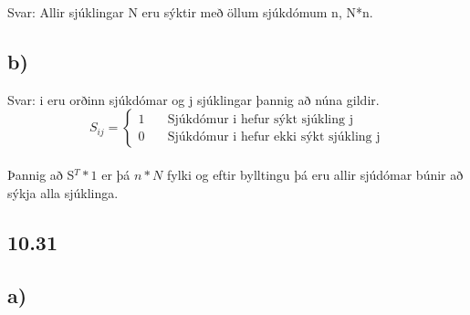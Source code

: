\documentclass[]{article}
\begin{document}
	Svar: Allir sjúklingar N eru sýktir með öllum sjúkdómum n, N*n.
	
	\subsection*{b)}
	
	Svar: i eru orðinn sjúkdómar og j sjúklingar þannig að núna gildir.\\
	
	\[ S_{ij} =
	\begin{cases}
	1       & \quad \text{Sjúkdómur i hefur sýkt sjúkling j}\\
	0	    & \quad \text{Sjúkdómur i hefur ekki sýkt sjúkling j}
	\end{cases}
	\]
	\\
	
	Þannig að S$ ^{T} * 1 $ er þá $ n * N $ fylki og eftir bylltingu þá eru allir sjúdómar búnir að sýkja alla sjúklinga. 
	
	\subsection*{10.31}
	
	\subsection*{a)}
	
	
	
\end{document}
